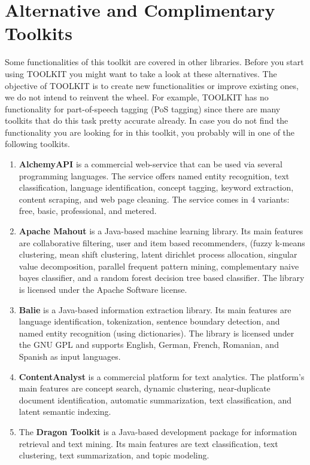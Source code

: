 \documentclass[a4paper,twoside]{book}      %
\begin{document}
\section{Alternative and Complimentary Toolkits}
Some functionalities of this toolkit are covered in other libraries. Before you start using TOOLKIT you might want to take a look at these alternatives. The objective of TOOLKIT is to create new functionalities or improve existing ones, we do not intend to reinvent the wheel. For example, TOOLKIT has no functionality for part-of-speech tagging (PoS tagging) since there are many toolkits that do this task pretty accurate already. In case you do not find the functionality you are looking for in this toolkit, you probably will in one of the following toolkits.

\begin{enumerate}
\item \textbf{AlchemyAPI} \cite{alchemyapi} is a commercial web-service that can be used via several programming languages. The service offers named entity recognition, text classification, language identification, concept tagging, keyword extraction, content scraping, and web page cleaning.
The service comes in 4 variants: free, basic, professional, and metered.
\item \textbf{Apache Mahout} \cite{settings2apache} is a Java-based machine learning library. Its main features are collaborative filtering, user and item based recommenders, (fuzzy k-means clustering, mean shift clustering, latent dirichlet process allocation, singular value decomposition, parallel frequent pattern mining, complementary naive bayes classifier, and a random forest decision tree based classifier.
The library is licensed under the Apache Software license.
\item \textbf{Balie} \cite{balie} is a Java-based information extraction library. Its main features are language identification, tokenization, sentence boundary detection, and named entity recognition (using dictionaries).
The library is licensed under the GNU GPL and supports English, German, French, Romanian, and Spanish as input languages.
\item \textbf{ContentAnalyst} \cite{contentanalyst} is a commercial platform for text analytics. The platform's main features are concept search, dynamic clustering, near-duplicate document identification, automatic summarization, text classification, and latent semantic indexing.
\item The \textbf{Dragon Toolkit} \cite{zhou2007dragon} is a Java-based development package for information retrieval and text mining. Its main features are text classification, text clustering, text summarization, and topic modeling.

\end{enumerate}
\end{document}
